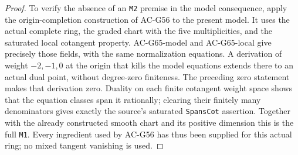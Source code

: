 \begin{proof}
To verify the absence of an \texttt{M2} premise in the
model consequence, apply the origin-completion construction
of AC-G56 to the present model. It uses the actual complete
ring, the graded chart with the five multiplicities, and
the saturated local cotangent property. AC-G65-model and
AC-G65-local give precisely those fields, with the same
normalization equations. A derivation of weight
\(-2,-1,0\) at the origin that kills the model equations
extends there to an actual dual point, without degree-zero
finiteness. The preceding zero statement makes that
derivation zero. Duality on each finite cotangent weight
space shows that the equation classes span it rationally;
clearing their finitely many denominators gives exactly
the source's saturated \texttt{SpansCot} assertion.
Together with the already constructed smooth chart and
its positive dimension this is the full \texttt{M1}.
Every ingredient used by AC-G56 has thus been supplied for
this actual ring; no mixed tangent vanishing is used.
\end{proof}

